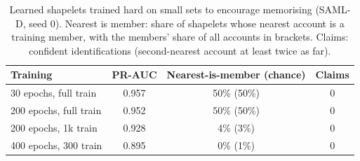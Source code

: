 \begin{table}[t]
\caption{Learned shapelets trained hard on small sets to encourage memorising (SAML-D, seed 0). Nearest is member: share of shapelets whose nearest account is a training member, with the members' share of all accounts in brackets. Claims: confident identifications (second-nearest account at least twice as far).}
\label{tab:probe}
\small\setlength{\tabcolsep}{3pt}
\centering
\begin{tabular}{lccc}
\toprule
Training & PR-AUC & Nearest-is-member (chance) & Claims \\
\midrule
30 epochs, full train & 0.957 & 50\% (50\%) & 0 \\
200 epochs, full train & 0.952 & 50\% (50\%) & 0 \\
200 epochs, 1k train & 0.928 & 4\% (3\%) & 0 \\
400 epochs, 300 train & 0.895 & 0\% (1\%) & 0 \\
\bottomrule\end{tabular}\end{table}
